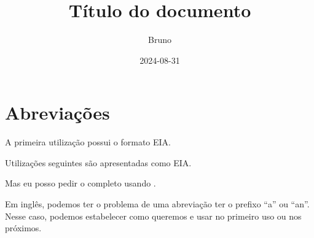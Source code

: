 \documentclass[dsc,male,12pt,a4paper,oneside]{ita}
\title{Título do documento}
\author{Bruno}
\date{2024-08-31}
\begin{document}
\frontmatter
\maketitle

\listoffigures
\listoftables

\printglossary[type=\acronymtype, title={Abreviações}, nonumberlist]
\tableofcontents

\mainmatter
\chapter{Abreviações}

A primeira utilização possui o formato \gls{EIA}.


Utilizações seguintes são apresentadas como \gls{EIA}.


Mas eu posso pedir o completo usando .

Em inglês, podemos ter o problema de uma abreviação ter o prefixo ``a'' ou ``an''. Nesse caso, podemos estabelecer como queremos e usar  no primeiro uso ou  nos próximos.
\end{document}
